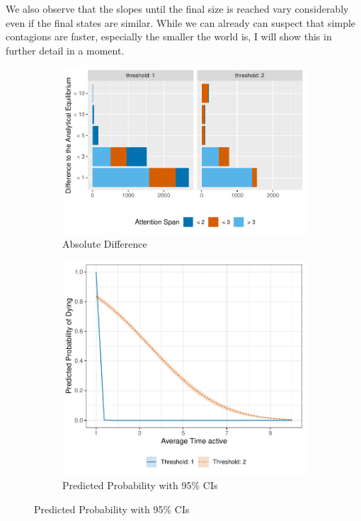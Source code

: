 \documentclass[a4paper,12pt]{article}
\begin{document}
We also observe that the slopes until the final size is reached vary considerably even if the final states are similar. While we can already can suspect that simple contagions are faster, especially the smaller the world is, I will show this in further detail in a moment.

\begin{figure}
\caption{Deviation from the analytical Equilibrium and Probability of Dying}
\begin{subfigure}{.5\textwidth}
\centering
\includegraphics[width=\linewidth]{images/difference.pdf}
\caption{Absolute Difference}
\end{subfigure}
\begin{subfigure}{.5\textwidth}
\centering
\includegraphics[width=\linewidth]{images/died_attention_span.pdf}
\caption{Predicted Probability with 95\% CIs}
\end{subfigure}
\label{fig:dev_die}
\end{figure}
\end{document}
